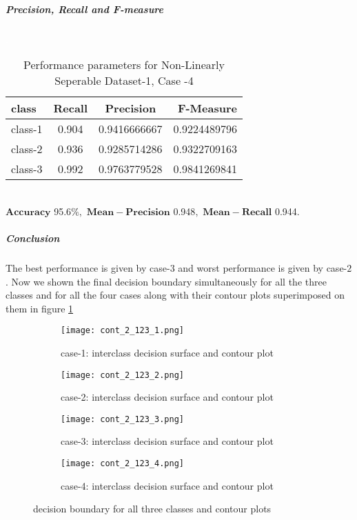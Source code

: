 \documentclass[a4paper]{article}
\begin{document}
\subparagraph{Precision, Recall and F-measure} \textcolor{white}{:}
\begin{table}[h!]
  \begin{center}
    \caption{Performance parameters for Non-Linearly Seperable Dataset-1, Case -4}
    \label{tab:table1}
    \begin{tabular}{l|c|c|r} %
      \textbf{class} & \textbf{Recall} & \textbf{Precision} & \textbf{F-Measure}\\
      \hline
      class-1 & 0.904 & 0.9416666667 & 0.9224489796\\
      class-2 & 0.936 & 0.9285714286 & 0.9322709163\\
      class-3 & 0.992 & 0.9763779528 & 0.9841269841\\
    \end{tabular}
  \end{center}
\end{table}
\\$\mathbf{Accuracy}$ 95.6$\%,$ $\mathbf{Mean -Precision}$ 0.948$,$ $\mathbf{Mean- Recall}$ 0.944$.$
\newpage
\subparagraph{Conclusion}
The best performance is given by case-$3$ and worst performance is given by case-$2$. Now we shown the final decision boundary simultaneously for all the three classes and for all the four cases along with their contour plots superimposed on them in figure \ref{fig:cont_2_4}
\begin{figure}[h!]
  \centering
  \begin{subfigure}[b]{0.4\linewidth}
    \texttt{[image: cont\_2\_123\_1.png]}
     \caption{case-1: interclass decision surface and contour plot}
  \end{subfigure}
  \begin{subfigure}[b]{0.4\linewidth}
    \texttt{[image: cont\_2\_123\_2.png]}
    \caption{case-2: interclass decision surface and contour plot}
  \end{subfigure}
  \begin{subfigure}[b]{0.4\linewidth}
    \texttt{[image: cont\_2\_123\_3.png]}
    \caption{case-3: interclass decision surface and contour plot}
  \end{subfigure}
  \begin{subfigure}[b]{0.4\linewidth}
    \texttt{[image: cont\_2\_123\_4.png]}
    \caption{case-4: interclass decision surface and contour plot}
  \end{subfigure}
  \caption{decision boundary for all three classes and contour plots}
  \label{fig:cont_2_4}
\end{figure}
\newpage
\end{document}
